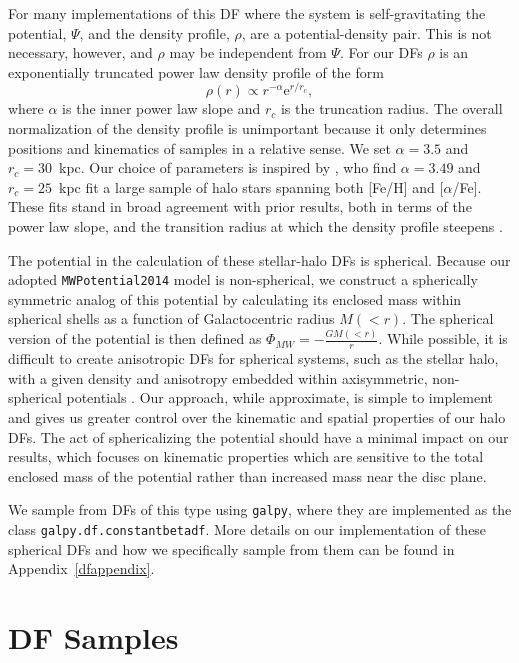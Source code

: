 For many implementations of this DF where the system is self-gravitating the potential, $\Psi$, and the density profile, $\rho$, are a potential-density pair. This is not necessary, however, and $\rho$ may be independent from $\Psi$. For our DFs $\rho$ is an exponentially truncated power law density profile of the form
\begin{equation}
    \rho(r) \propto r^{-\alpha}\mathrm{e}^{r/r_{c}},
\end{equation}
where $\alpha$ is the inner power law slope and $r_{c}$ is the truncation radius. The overall normalization of the density profile is unimportant because it only determines positions and kinematics of samples in a relative sense. We set $\alpha=3.5$ and $r_{c}=30$~kpc. Our choice of parameters is inspired by \citet{mackereth20}, who find $\alpha=3.49$ and $r_{c}=25$~kpc fit a large sample of halo stars spanning both [Fe/H] and [$\alpha$/Fe]. These fits stand in broad agreement with prior results, both in terms of the power law slope, and the transition radius at which the density profile steepens \citep{deason11,xue15,iorio18}.

The potential in the calculation of these stellar-halo DFs is spherical. Because our adopted \texttt{MWPotential2014} model is non-spherical, we construct a spherically symmetric analog of this potential by calculating its enclosed mass within spherical shells as a function of Galactocentric radius $M(<r)$. The spherical version of the potential is then defined as $\Phi_{MW} = -\frac{GM(<r)}{r}$. While possible, it is difficult to create anisotropic DFs for spherical systems, such as the stellar halo, with a given density and anisotropy embedded within axisymmetric, non-spherical potentials \citep{posti15,williams15}. Our approach, while approximate, is simple to implement and gives us greater control over the kinematic and spatial properties of our halo DFs. The act of sphericalizing the potential should have a minimal impact on our results, which focuses on kinematic properties which are sensitive to the total enclosed mass of the potential rather than increased mass near the disc plane. 

We sample from DFs of this type using \texttt{galpy}, where they are implemented as the class \texttt{galpy.df.constantbetadf}. More details on our implementation of these spherical DFs and how we specifically sample from them can be found in Appendix~\ref{dfappendix}.

\section{DF Samples}
\label{sec:DFSamples}

